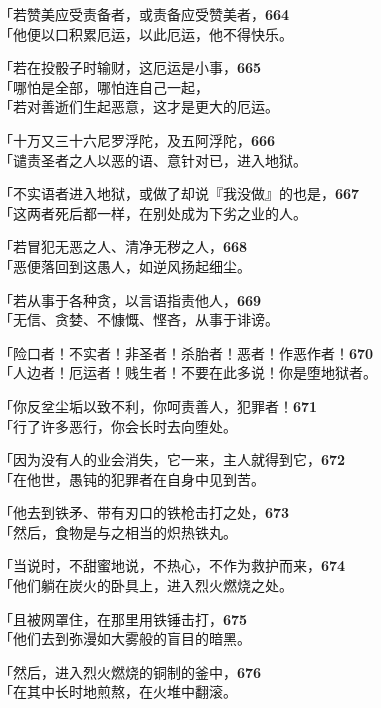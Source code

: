 「若赞美应受责备者，或责备应受赞美者，\hfill{\grayfootnotesize \textbf{664}} \\
「他便以口积累厄运，以此厄运，他不得快乐。


「若在投骰子时输财，这厄运是小事，\hfill{\grayfootnotesize \textbf{665}} \\
「哪怕是全部，哪怕连自己一起，\\
「若对善逝们生起恶意，这才是更大的厄运。


「十万又三十六尼罗浮陀，及五阿浮陀，\hfill{\grayfootnotesize \textbf{666}} \\
「谴责圣者之人以恶的语、意针对已，进入地狱。


「不实语者进入地狱，或做了却说『我没做』的也是，\hfill{\grayfootnotesize \textbf{667}} \\
「这两者死后都一样，在别处成为下劣之业的人。


「若冒犯无恶之人、清净无秽之人，\hfill{\grayfootnotesize \textbf{668}} \\
「恶便落回到这愚人，如逆风扬起细尘。


「若从事于各种贪，以言语指责他人，\hfill{\grayfootnotesize \textbf{669}} \\
「无信、贪婪、不慷慨、悭吝，从事于诽谤。


「险口者！不实者！非圣者！杀胎者！恶者！作恶作者！\hfill{\grayfootnotesize \textbf{670}} \\
「人边者！厄运者！贱生者！不要在此多说！你是堕地狱者。


「你反坌尘垢以致不利，你呵责善人，犯罪者！\hfill{\grayfootnotesize \textbf{671}} \\
「行了许多恶行，你会长时去向堕处。


「因为没有人的业会消失，它一来，主人就得到它，\hfill{\grayfootnotesize \textbf{672}} \\
「在他世，愚钝的犯罪者在自身中见到苦。


「他去到铁矛、带有刃口的铁枪击打之处，\hfill{\grayfootnotesize \textbf{673}} \\
「然后，食物是与之相当的炽热铁丸。


「当说时，不甜蜜地说，不热心，不作为救护而来，\hfill{\grayfootnotesize \textbf{674}} \\
「他们躺在炭火的卧具上，进入烈火燃烧之处。


「且被网罩住，在那里用铁锤击打，\hfill{\grayfootnotesize \textbf{675}} \\
「他们去到弥漫如大雾般的盲目的暗黑。


「然后，进入烈火燃烧的铜制的釜中，\hfill{\grayfootnotesize \textbf{676}} \\
「在其中长时地煎熬，在火堆中翻滚。


